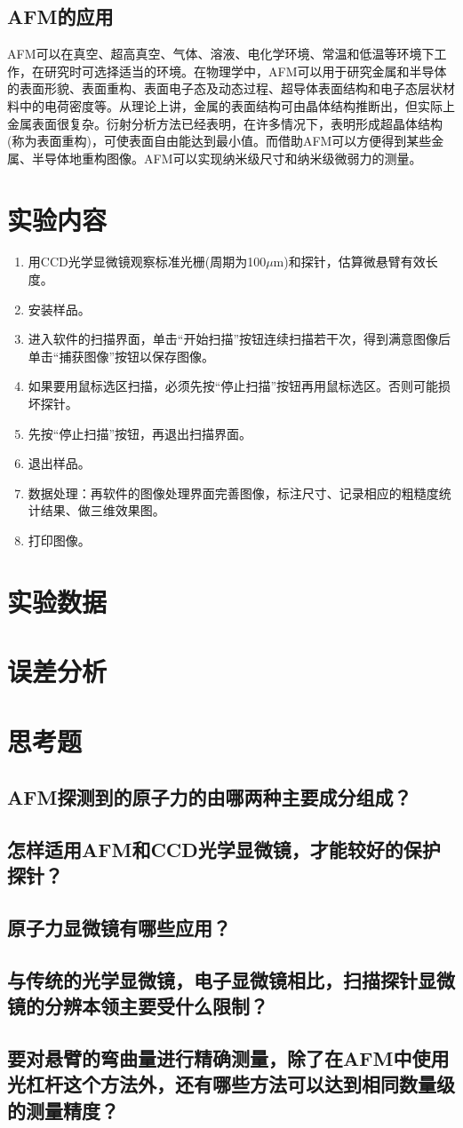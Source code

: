 \documentclass[a4paper]{article}
\begin{document}
\subsection{AFM的应用}
AFM可以在真空、超高真空、气体、溶液、电化学环境、常温和低温等环境下工作，在研究时可选择适当的环境。在物理学中，AFM可以用于研究金属和半导体的表面形貌、表面重构、表面电子态及动态过程、超导体表面结构和电子态层状材料中的电荷密度等。从理论上讲，金属的表面结构可由晶体结构推断出，但实际上金属表面很复杂。衍射分析方法已经表明，在许多情况下，表明形成超晶体结构(称为表面重构)，可使表面自由能达到最小值。而借助AFM可以方便得到某些金属、半导体地重构图像。AFM可以实现纳米级尺寸和纳米级微弱力的测量。

\section{实验内容}
\begin{enumerate}
\item 用CCD光学显微镜观察标准光栅(周期为100$\mu$m)和探针，估算微悬臂有效长度。
\item 安装样品。
\item 进入软件的扫描界面，单击“开始扫描”按钮连续扫描若干次，得到满意图像后单击“捕获图像”按钮以保存图像。
\item 如果要用鼠标选区扫描，必须先按“停止扫描”按钮再用鼠标选区。否则可能损坏探针。
\item 先按“停止扫描”按钮，再退出扫描界面。
\item 退出样品。
\item 数据处理：再软件的图像处理界面完善图像，标注尺寸、记录相应的粗糙度统计结果、做三维效果图。
\item 打印图像。
\end{enumerate}

\section{实验数据}

\section{误差分析}

\section{思考题}
\subsection{AFM探测到的原子力的由哪两种主要成分组成？}
\subsection{怎样适用AFM和CCD光学显微镜，才能较好的保护探针？}
\subsection{原子力显微镜有哪些应用？}
\subsection{与传统的光学显微镜，电子显微镜相比，扫描探针显微镜的分辨本领主要受什么限制？}
\subsection{要对悬臂的弯曲量进行精确测量，除了在AFM中使用光杠杆这个方法外，还有哪些方法可以达到相同数量级的测量精度？}

\nocite{jiaocai}

\end{document}

